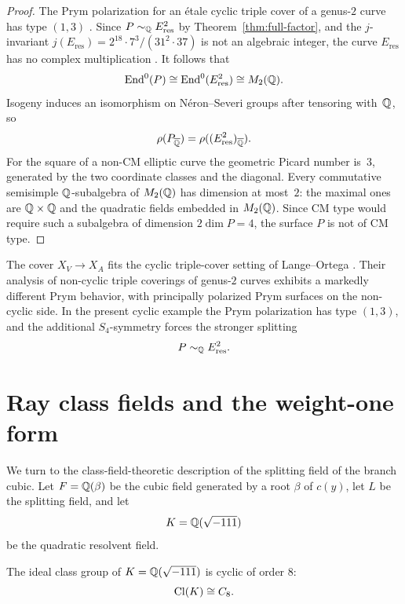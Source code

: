 \begin{proof}
The Prym polarization for an \'etale cyclic triple cover of a genus-\(2\) curve has type \((1,3)\) \cite[Section~12.9]{BirkenhakeLange2004}. Since \(P\sim_{\mathbb{Q}}E_{\mathrm{res}}^2\) by Theorem~\ref{thm:full-factor}, and the \(j\)-invariant \(j(E_{\mathrm{res}})=2^{18}\cdot 7^3/(31^2\cdot 37)\) is not an algebraic integer, the curve \(E_{\mathrm{res}}\) has no complex multiplication \cite[Ch.~II]{SilvermanATAEC}. It follows that
\[
\operatorname{End}^0(P)\cong \operatorname{End}^0(E_{\mathrm{res}}^2)\cong M_2(\mathbb{Q}).
\]
Isogeny induces an isomorphism on N\'eron--Severi groups after tensoring with~\(\mathbb{Q}\), so
\[
\rho(P_{\overline{\mathbb{Q}}})=\rho((E_{\mathrm{res}}^2)_{\overline{\mathbb{Q}}}).
\]
For the square of a non-CM elliptic curve the geometric Picard number is~\(3\), generated by the two coordinate classes and the diagonal. Every commutative semisimple \(\mathbb{Q}\)-subalgebra of \(M_2(\mathbb{Q})\) has dimension at most~\(2\): the maximal ones are \(\mathbb{Q}\times\mathbb{Q}\) and the quadratic fields embedded in \(M_2(\mathbb{Q})\). Since CM type would require such a subalgebra of dimension \(2\dim P=4\), the surface \(P\) is not of CM type.
\end{proof}

\begin{remark}\label{rem:prym-triple-cover-context}
The cover \(X_V\to X_A\) fits the cyclic triple-cover setting of Lange--Ortega \cite{LangeOrtega2011}. Their analysis of non-cyclic triple coverings of genus-\(2\) curves \cite{LangeOrtegaTriple2011} exhibits a markedly different Prym behavior, with principally polarized Prym surfaces on the non-cyclic side. In the present cyclic example the Prym polarization has type \((1,3)\), and the additional \(S_4\)-symmetry forces the stronger splitting
\[
P\sim_{\mathbb{Q}}E_{\mathrm{res}}^2.
\]
\end{remark}

\section{Ray class fields and the weight-one form}

We turn to the class-field-theoretic description of the splitting field of the branch cubic. Let \(F=\mathbb{Q}(\beta)\) be the cubic field generated by a root \(\beta\) of \(c(y)\), let \(L\) be the splitting field, and let
\[
K=\mathbb{Q}(\sqrt{-111})
\]
be the quadratic resolvent field.

\begin{proposition}\label{prop:class-group}
The ideal class group of \(K=\mathbb{Q}(\sqrt{-111})\) is cyclic of order \(8\):
\[
\operatorname{Cl}(K)\cong C_8.
\]
\end{proposition}

